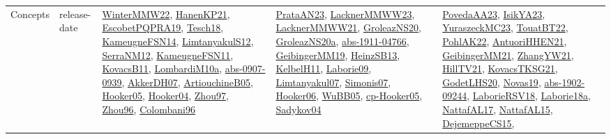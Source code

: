 {\begin{longtable}{lp{3cm}>{\raggedright}p{6cm}>{\raggedright}p{6cm}p{8cm}}
Concepts & release-date & \href{papers/WinterMMW22.pdf}{WinterMMW22}\cite{WinterMMW22}, \href{papers/HanenKP21.pdf}{HanenKP21}\cite{HanenKP21}, \href{articles/EscobetPQPRA19.pdf}{EscobetPQPRA19}\cite{EscobetPQPRA19}, \href{papers/Tesch18.pdf}{Tesch18}\cite{Tesch18}, \href{articles/KameugneFSN14.pdf}{KameugneFSN14}\cite{KameugneFSN14}, \href{articles/LimtanyakulS12.pdf}{LimtanyakulS12}\cite{LimtanyakulS12}, \href{papers/SerraNM12.pdf}{SerraNM12}\cite{SerraNM12}, \href{papers/KameugneFSN11.pdf}{KameugneFSN11}\cite{KameugneFSN11}, \href{articles/KovacsB11.pdf}{KovacsB11}\cite{KovacsB11}, \href{articles/LombardiM10a.pdf}{LombardiM10a}\cite{LombardiM10a}, \href{articles/abs-0907-0939.pdf}{abs-0907-0939}\cite{abs-0907-0939}, \href{papers/AkkerDH07.pdf}{AkkerDH07}\cite{AkkerDH07}, \href{papers/ArtiouchineB05.pdf}{ArtiouchineB05}\cite{ArtiouchineB05}, \href{articles/Hooker05.pdf}{Hooker05}\cite{Hooker05}, \href{papers/Hooker04.pdf}{Hooker04}\cite{Hooker04}, \href{articles/Zhou97.pdf}{Zhou97}\cite{Zhou97}, \href{papers/Zhou96.pdf}{Zhou96}\cite{Zhou96}, \href{papers/Colombani96.pdf}{Colombani96}\cite{Colombani96} & \href{articles/PrataAN23.pdf}{PrataAN23}\cite{PrataAN23}, \href{articles/LacknerMMWW23.pdf}{LacknerMMWW23}\cite{LacknerMMWW23}, \href{papers/LacknerMMWW21.pdf}{LacknerMMWW21}\cite{LacknerMMWW21}, \href{papers/GroleazNS20.pdf}{GroleazNS20}\cite{GroleazNS20}, \href{papers/GroleazNS20a.pdf}{GroleazNS20a}\cite{GroleazNS20a}, \href{articles/abs-1911-04766.pdf}{abs-1911-04766}\cite{abs-1911-04766}, \href{papers/GeibingerMM19.pdf}{GeibingerMM19}\cite{GeibingerMM19}, \href{articles/HeinzSB13.pdf}{HeinzSB13}\cite{HeinzSB13}, \href{articles/KelbelH11.pdf}{KelbelH11}\cite{KelbelH11}, \href{papers/Laborie09.pdf}{Laborie09}\cite{Laborie09}, \href{papers/Limtanyakul07.pdf}{Limtanyakul07}\cite{Limtanyakul07}, \href{articles/Simonis07.pdf}{Simonis07}\cite{Simonis07}, \href{articles/Hooker06.pdf}{Hooker06}\cite{Hooker06}, \href{papers/WuBB05.pdf}{WuBB05}\cite{WuBB05}, \href{papers/cp-Hooker05.pdf}{cp-Hooker05}\cite{cp-Hooker05}, \href{papers/Sadykov04.pdf}{Sadykov04}\cite{Sadykov04} & \href{papers/PovedaAA23.pdf}{PovedaAA23}\cite{PovedaAA23}, \href{articles/IsikYA23.pdf}{IsikYA23}\cite{IsikYA23}, \href{papers/YuraszeckMC23.pdf}{YuraszeckMC23}\cite{YuraszeckMC23}, \href{papers/TouatBT22.pdf}{TouatBT22}\cite{TouatBT22}, \href{articles/PohlAK22.pdf}{PohlAK22}\cite{PohlAK22}, \href{papers/AntuoriHHEN21.pdf}{AntuoriHHEN21}\cite{AntuoriHHEN21}, \href{papers/GeibingerMM21.pdf}{GeibingerMM21}\cite{GeibingerMM21}, \href{articles/ZhangYW21.pdf}{ZhangYW21}\cite{ZhangYW21}, \href{papers/HillTV21.pdf}{HillTV21}\cite{HillTV21}, \href{papers/KovacsTKSG21.pdf}{KovacsTKSG21}\cite{KovacsTKSG21}, \href{papers/GodetLHS20.pdf}{GodetLHS20}\cite{GodetLHS20}, \href{articles/Novas19.pdf}{Novas19}\cite{Novas19}, \href{articles/abs-1902-09244.pdf}{abs-1902-09244}\cite{abs-1902-09244}, \href{articles/LaborieRSV18.pdf}{LaborieRSV18}\cite{LaborieRSV18}, \href{papers/Laborie18a.pdf}{Laborie18a}\cite{Laborie18a}, \href{articles/NattafAL17.pdf}{NattafAL17}\cite{NattafAL17}, \href{articles/NattafAL15.pdf}{NattafAL15}\cite{NattafAL15}, \href{papers/DejemeppeCS15.pdf}{DejemeppeCS15}\cite{DejemeppeCS15}, 
\end{longtable}}
